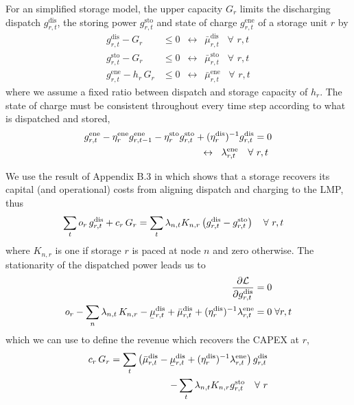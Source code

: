 \documentclass[11pt,twocolumn]{article}
\newcommand{\ubar}[1]{\underaccent{\bar}{#1}}
\newcommand{\resultsin}[1]{\hspace{6pt} \leftrightarrow  \hspace{6pt} #1}
\newcommand{\Forall}[1]{\hspace{10pt} \forall \,\, #1 }
\newcommand{\pdv}[2]{\frac{\partial #1}{\partial #2}}
\newcommand{\storage}{g_{r,t}}
\newcommand{\storagedispatch}{\storage^\text{dis}}
\newcommand{\storagecharge}{\storage^\text{sto}}
\newcommand{\storagesoc}{\storage^\text{ene}}
\newcommand{\storageprevioussoc}{g_{r,t-1}^\text{ene}}
\newcommand{\efficiency}{\eta_{r}}
\newcommand{\efficiencydispatch}{\efficiency^\text{dis}}
\newcommand{\efficiencycharge}{\efficiency^\text{sto}}
\newcommand{\efficiencysoc}{\efficiency^\text{ene}}
\newcommand{\operationalpricestorage}{o_r}
\newcommand{\capitalpricestorage}{c_r}
\newcommand{\capacitystorage}{G_r}
\newcommand{\mulowerstoragedispatch}{\ubar{\mu}_{r,t}^\text{dis}}
\newcommand{\muupperstoragedispatch}{\bar{\mu}_{r,t}^\text{dis}}
\newcommand{\muupperstoragecharge}{\bar{\mu}_{r,t}^\text{sto}}
\newcommand{\muupperstoragesoc}{\bar{\mu}_{r,t}^\text{ene}}
\newcommand{\mustateofcharge}{\lambda^\text{ene}_{r,t}}
\newcommand{\lagrangian}{\mathcal{L}}
\newcommand{\lmp}[1][n]{\lambda_{#1,t}}
\newcommand{\incidencestorage}[1][n]{K_{#1,r}}
\begin{document}
For an simplified storage model, the upper capacity $\capacitystorage$ limits the discharging dispatch $\storagedispatch$, the storing power $\storagecharge$ and state of charge $\storagesoc$ of a storage unit $r$ by 
\begin{align}
    \storagedispatch - \capacitystorage &\le 0  \resultsin{\muupperstoragedispatch} \Forall{r,t} \\
    \storagecharge - \capacitystorage &\le 0  \resultsin{\muupperstoragecharge} \Forall{r,t} \\
    \storagesoc - h_r \, \capacitystorage &\le 0  \resultsin{\muupperstoragesoc} \Forall{r,t}
\end{align}
where we assume a fixed ratio between dispatch and storage capacity of $h_r$. 
The state of charge must be consistent throughout every time step according to what is dispatched and stored, 
\begin{align}
    \notag
    \storagesoc - \efficiencysoc \storageprevioussoc - \efficiencycharge \storagecharge &+ (\efficiencydispatch)^{-1} \storagedispatch = 0 \\
    &\resultsin{\mustateofcharge} \Forall{r,t}
\end{align}



We use the result of Appendix B.3 in \cite{brown_decreasing_2020} which shows that a storage recovers its capital (and operational) costs from aligning dispatch and charging to the LMP, thus 
\begin{align}
    \notag
    \sum_t \operationalpricestorage \, \storagedispatch + \capitalpricestorage \, \capacitystorage = \sum_t \lmp \incidencestorage &\left(\storagedispatch - \storagecharge \right) \Forall{r,t}
\end{align}
where $\incidencestorage$ is one if storage $r$ is paced at node $n$ and zero otherwise. 
The stationarity of the dispatched power leads us to  
\begin{align}
    \notag
    \pdv{\lagrangian}{\storagedispatch} &= 0 \\
    \operationalpricestorage - \sum_n \lmp \, \incidencestorage - \mulowerstoragedispatch + \muupperstoragedispatch + (\efficiencydispatch )^{-1} \mustateofcharge &= 0 \;  \forall r,t
    \label{eq:stationarity_storagedispatch}
\end{align}
which we  can use to define the revenue which recovers the \ac{CAPEX} at $r$, 
\begin{align}
    \notag
    \capitalpricestorage \, \capacitystorage = \sum_t \left(\muupperstoragedispatch - \mulowerstoragedispatch  + (\efficiencydispatch )^{-1} \mustateofcharge \right) \storagedispatch \\
    - \sum_t \lmp \incidencestorage  \storagecharge \Forall{r} 
    \label{eq:no_profit_capex_storage2}
\end{align}
\end{document}
